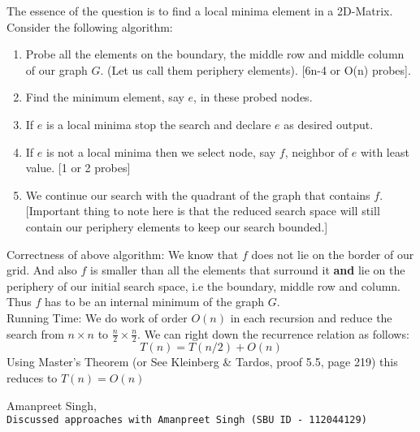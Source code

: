 \documentclass[11pt]{article}
\begin{document}
The essence of the question is to find a local minima element in a 2D-Matrix. \\

Consider the following algorithm:
\begin{enumerate}
\item  Probe all the elements on the boundary, the middle row and middle column of our graph $ G $. (Let us call them periphery elements). [6n-4  or O(n) probes].
\item  Find the minimum element, say $ e $, in these probed nodes.
\item  If $ e $ is a local minima stop the search and declare $ e $ as desired output.
\item  If $ e $ is not a local minima then we select node, say $ f $, neighbor of $ e $ with least value. [1 or 2 probes]
\item  We continue our search with the quadrant of the graph that contains $ f $. [Important thing to note here is that the reduced search space will still contain our periphery elements to keep our search bounded.]
\end{enumerate}

Correctness of above algorithm:
We know that $ f $ does not lie on the border of our grid. And also $ f $ is smaller than all the elements that surround it \textbf{and} lie on the periphery of our initial search space, i.e the boundary, middle row and column. Thus $ f $ has to be an internal minimum of the graph $ G $. \\

Running Time:
We do work of order $ O(n) $ in each recursion and reduce the search from $ n \times n $ to $ \frac{n}{2} \times \frac{n}{2} $. We can right down the recurrence relation as follows:
\begin{equation*}
T(n) = T(n/2) + O(n)
\end{equation*}
Using Master's Theorem (or See Kleinberg \& Tardos, proof 5.5, page 219) this reduces to $ T(n) = O(n) $

\clearpage

\begin{thebibliography}{9}
	Amanpreet Singh,
	\\\texttt{Discussed approaches with Amanpreet Singh (SBU ID - 112044129)}
	
\end{thebibliography}
\end{document}
